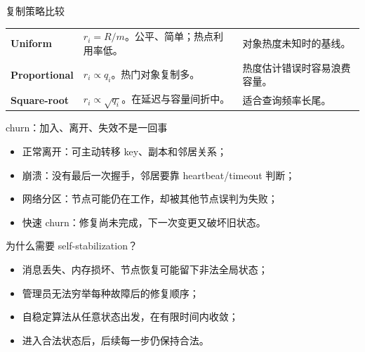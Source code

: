 \documentclass[UTF8,fontset=none,aspectratio=169,10pt]{beamer}
\begin{document}
\begin{frame}{复制策略比较}
\begin{tabularx}{\linewidth}{>{\bfseries}p{3cm}XX}
\toprule
Uniform & $r_i=R/m$。公平、简单；热点利用率低。 & 对象热度未知时的基线。 \\
Proportional & $r_i\propto q_i$。热门对象复制多。 & 热度估计错误时容易浪费容量。 \\
Square-root & $r_i\propto\sqrt{q_i}$。在延迟与容量间折中。 & 适合查询频率长尾。 \\
\bottomrule
\end{tabularx}
\end{frame}

\begin{frame}{churn：加入、离开、失效不是一回事}
\begin{itemize}
  \item 正常离开：可主动转移 key、副本和邻居关系；
  \item 崩溃：没有最后一次握手，邻居要靠 heartbeat/timeout 判断；
  \item 网络分区：节点可能仍在工作，却被其他节点误判为失败；
  \item 快速 churn：修复尚未完成，下一次变更又破坏旧状态。
\end{itemize}
\end{frame}


\begin{frame}{为什么需要 self-stabilization？}
\begin{itemize}
  \item 消息丢失、内存损坏、节点恢复可能留下非法全局状态；
  \item 管理员无法穷举每种故障后的修复顺序；
  \item 自稳定算法从任意状态出发，在有限时间内收敛；
  \item 进入合法状态后，后续每一步仍保持合法。
\end{itemize}
\vfill
{}
\end{frame}
\end{document}
